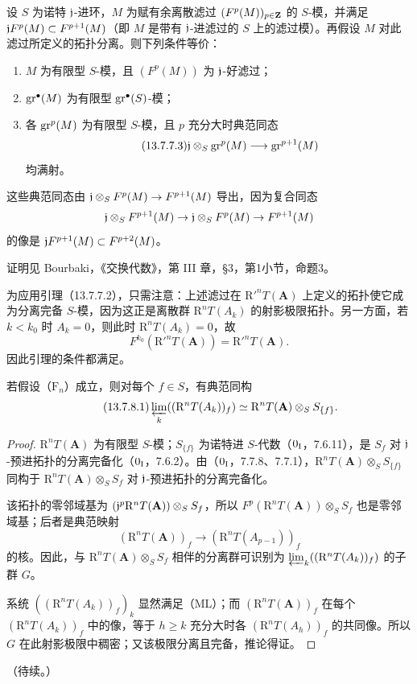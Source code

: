 设 $S$ 为诺特 $\mathfrak j$-进环，$M$ 为赋有余离散滤过 $(F^p(M))_{p\in\mathbf Z}$ 的 $S$-模，并满足 $\mathfrak j F^p(M)\subset F^{p+1}(M)$（即 $M$ 是带有 $\mathfrak j$-进滤过的 $S$ 上的滤过模）。再假设 $M$ 对此滤过所定义的拓扑分离。则下列条件等价：
\begin{enumerate}[label=\alph*)]
\item $M$ 为有限型 $S$-模，且 $(F^p(M))$ 为 $\mathfrak j$-好滤过；
\item $\operatorname{gr}^\bullet(M)$ 为有限型 $\operatorname{gr}^\bullet(S)$-模；
\item 各 $\operatorname{gr}^p(M)$ 为有限型 $S$-模，且 $p$ 充分大时典范同态
\begin{equation}\tag{13.7.7.3}
\mathfrak j\otimes_S\operatorname{gr}^p(M)\longrightarrow\operatorname{gr}^{p+1}(M)
\end{equation}
均满射。
\end{enumerate}
这些典范同态由 $\mathfrak j\otimes_S F^p(M)\to F^{p+1}(M)$ 导出，因为复合同态
\[
\mathfrak j\otimes_S F^{p+1}(M)\to\mathfrak j\otimes_S F^p(M)\to F^{p+1}(M)
\]
的像是 $\mathfrak j F^{p+1}(M)\subset F^{p+2}(M)$。

证明见 Bourbaki，《交换代数》，第 III 章，§3，第1小节，命题3。

为应用引理（13.7.7.2），只需注意：上述滤过在 $\mathrm R'^nT(\mathbf A)$ 上定义的拓扑使它成为分离完备 $S$-模，因为这正是离散群 $\mathrm R^nT(A_k)$ 的射影极限拓扑。另一方面，若 $k<k_0$ 时 $A_k=0$，则此时 $\mathrm R^nT(A_k)=0$，故
\[
F^{k_0}(\mathrm R'^nT(\mathbf A))=\mathrm R'^nT(\mathbf A).
\]
因此引理的条件都满足。
\finishproof

若假设（$\mathrm F_n$）成立，则对每个 $f\in S$，有典范同构
\begin{equation}\tag{13.7.8.1}
\varprojlim_k((\mathrm R^nT(A_k))_f)
\simeq\mathrm R^nT(\mathbf A)\otimes_S S_{\{f\}}.
\end{equation}
\begin{proof}
$\mathrm R^nT(\mathbf A)$ 为有限型 $S$-模；$S_{\{f\}}$ 为诺特进 $S$-代数（$0_{\mathrm I}$，7.6.11），是 $S_f$ 对 $\mathfrak j$-预进拓扑的分离完备化（$0_{\mathrm I}$，7.6.2）。由（$0_{\mathrm I}$，7.7.8、7.7.1），$\mathrm R^nT(\mathbf A)\otimes_S S_{\{f\}}$ 同构于 $\mathrm R^nT(\mathbf A)\otimes_S S_f$ 对 $\mathfrak j$-预进拓扑的分离完备化。

该拓扑的零邻域基为 $(\mathfrak j^p\mathrm R^nT(\mathbf A))\otimes_S S_f$，所以 $F^p(\mathrm R^nT(\mathbf A))\otimes_S S_f$ 也是零邻域基；后者是典范映射
\[
(\mathrm R^nT(\mathbf A))_f\longrightarrow(\mathrm R^nT(A_{p-1}))_f
\]
的核。因此，与 $\mathrm R^nT(\mathbf A)\otimes_S S_f$ 相伴的分离群可识别为 $\varprojlim_k((\mathrm R^nT(A_k))_f)$ 的子群 $G$。

系统 $((\mathrm R^nT(A_k))_f)_k$ 显然满足（ML）；而 $(\mathrm R^nT(\mathbf A))_f$ 在每个 $(\mathrm R^nT(A_k))_f$ 中的像，等于 $h\geq k$ 充分大时各 $(\mathrm R^nT(A_h))_f$ 的共同像。所以 $G$ 在此射影极限中稠密；又该极限分离且完备，推论得证。
\end{proof}
\begin{flushright}（待续。）\end{flushright}\par

